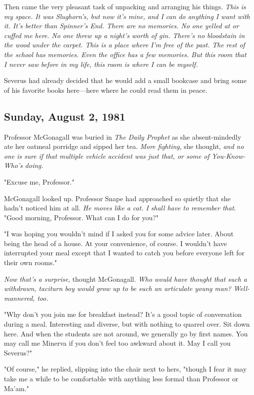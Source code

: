 Then came the very pleasant task of unpacking and arranging his things. \emph{This is my space. It was Slughorn's, but now it's mine, and I can do anything I want with it. It's better than Spinner's End. There are no memories. No one yelled at or cuffed me here. No one threw up a night's worth of gin. There's no bloodstain in the wood under the carpet. This is a place where I'm free of the past. The rest of the school has memories. Even the office has a few memories. But this room that I never saw before in my life, this room is where I can be myself.}

Severus had already decided that he would add a small bookcase and bring some of his favorite books here—here where he could read them in peace.

\subsection{Sunday, August 2, 1981}

Professor McGonagall was buried in \emph{The Daily Prophet} as she absent-mindedly ate her oatmeal porridge and sipped her tea. \emph{More fighting}, she thought, \emph{and no one is sure if that multiple vehicle accident was just that, or some of You-Know-Who's doing.}

"Excuse me, Professor."

McGonagall looked up. Professor Snape had approached so quietly that she hadn't noticed him at all. \emph{He moves like a cat. I shall have to remember that}. "Good morning, Professor. What can I do for you?"

"I was hoping you wouldn't mind if I asked you for some advice later. About being the head of a house. At your convenience, of course. I wouldn't have interrupted your meal except that I wanted to catch you before everyone left for their own rooms."

\emph{Now that's a surprise,} thought McGonagall. \emph{Who would have thought that such a withdrawn, taciturn boy would grow up to be such an articulate young man? Well-mannered, too.}

"Why don't you join me for breakfast instead? It's a good topic of conversation during a meal. Interesting and diverse, but with nothing to quarrel over. Sit down here. And when the students are not around, we generally go by first names. You may call me Minerva if you don't feel too awkward about it. May I call you Severus?"

"Of course," he replied, slipping into the chair next to hers, "though I fear it may take me a while to be comfortable with anything less formal than Professor or Ma'am."

